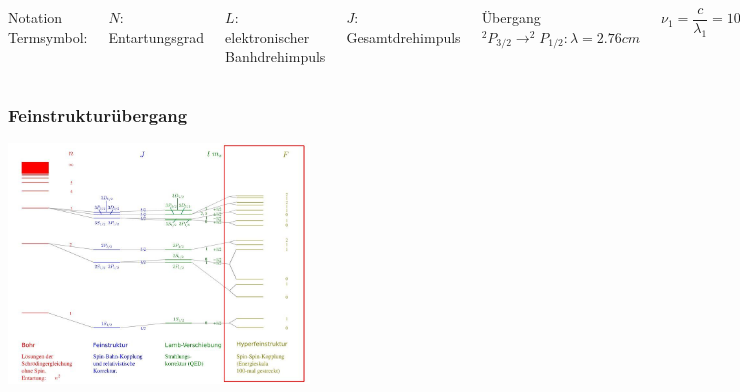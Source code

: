 \begin{frame}
	\begin{columns}
		
		Notation Termsymbol: 
	
		$N:$ Entartungsgrad
		
		$L:$ elektronischer Banhdrehimpuls
		
		$J:$ Gesamtdrehimpuls
		
		\vspace{1cm}
		\vspace{1cm}
		
		Übergang $^2P_{3/2} \rightarrow ^2P_{1/2}: \lambda = 2.76cm$
				
		$\nu_1 = \dfrac{c}{\lambda_1} = 10,9 GHz $
		\vspace{.5cm}
				
		\includegraphics[width = 4cm]{./pictures/orbitale}
		
		\includegraphics[width = 4cm]{./pictures/wasserstoffSpektrum}
			
		\includegraphics[width = 4cm]{./pictures/fine_structure_hydrogen}
	\end{columns}
\end{frame}

\begin{frame}
	\frametitle {Feinstrukturübergang}
	
	\begin{center}
		\includegraphics[width = 8cm]{./pictures/energieniveaus3}
	\end{center}
	
\end{frame}


